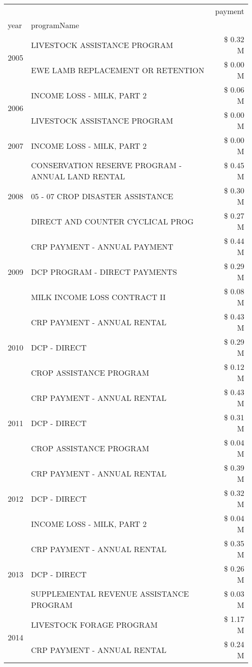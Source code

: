 \begin{tabular}{llr}
\toprule
 &  & payment \\
year & programName &  \\
\midrule
\multirow[t]{2}{*}{2005} & LIVESTOCK ASSISTANCE PROGRAM & \$ 0.32 M \\
 & EWE LAMB REPLACEMENT OR RETENTION & \$ 0.00 M \\
\cline{1-3}
\multirow[t]{2}{*}{2006} & INCOME LOSS - MILK, PART 2 & \$ 0.06 M \\
 & LIVESTOCK ASSISTANCE PROGRAM & \$ 0.00 M \\
\cline{1-3}
2007 & INCOME LOSS - MILK, PART 2 & \$ 0.00 M \\
\cline{1-3}
\multirow[t]{3}{*}{2008} & CONSERVATION RESERVE PROGRAM - ANNUAL LAND RENTAL & \$ 0.45 M \\
 & 05 - 07 CROP DISASTER ASSISTANCE & \$ 0.30 M \\
 & DIRECT AND COUNTER CYCLICAL PROG & \$ 0.27 M \\
\cline{1-3}
\multirow[t]{3}{*}{2009} & CRP PAYMENT - ANNUAL PAYMENT & \$ 0.44 M \\
 & DCP PROGRAM - DIRECT PAYMENTS & \$ 0.29 M \\
 & MILK INCOME LOSS CONTRACT II & \$ 0.08 M \\
\cline{1-3}
\multirow[t]{3}{*}{2010} & CRP PAYMENT - ANNUAL RENTAL & \$ 0.43 M \\
 & DCP - DIRECT & \$ 0.29 M \\
 & CROP ASSISTANCE PROGRAM & \$ 0.12 M \\
\cline{1-3}
\multirow[t]{3}{*}{2011} & CRP PAYMENT - ANNUAL RENTAL & \$ 0.43 M \\
 & DCP - DIRECT & \$ 0.31 M \\
 & CROP ASSISTANCE PROGRAM & \$ 0.04 M \\
\cline{1-3}
\multirow[t]{3}{*}{2012} & CRP PAYMENT - ANNUAL RENTAL & \$ 0.39 M \\
 & DCP - DIRECT & \$ 0.32 M \\
 & INCOME LOSS - MILK, PART 2 & \$ 0.04 M \\
\cline{1-3}
\multirow[t]{3}{*}{2013} & CRP PAYMENT - ANNUAL RENTAL & \$ 0.35 M \\
 & DCP - DIRECT & \$ 0.26 M \\
 & SUPPLEMENTAL REVENUE ASSISTANCE PROGRAM & \$ 0.03 M \\
\cline{1-3}
\multirow[t]{3}{*}{2014} & LIVESTOCK FORAGE PROGRAM & \$ 1.17 M \\
 & CRP PAYMENT - ANNUAL RENTAL & \$ 0.24 M \\

\end{tabular}

